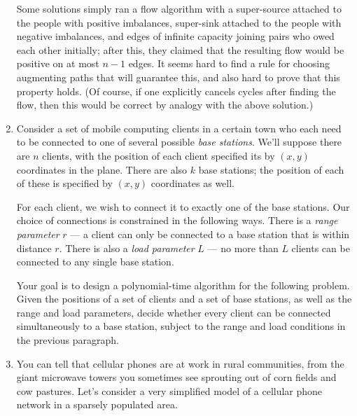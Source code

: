 \documentclass[12pt]{article}
\begin{document}
\begin{enumerate}
{Some solutions simply ran a flow algorithm with
a super-source attached to the people with positive
imbalances, super-sink attached to the people with negative imbalances,
and edges of infinite capacity joining pairs who owed each other initially;
after this, they claimed that the resulting flow would be
positive on at most $n-1$ edges.
It seems hard to find a rule for choosing augmenting paths that
will guarantee this, and also hard to prove that this property holds.
(Of course, if one explicitly cancels cycles after finding
the flow, then this would be correct by analogy with the above solution.)

}

\item


Consider a set of mobile computing clients
in a certain town
who each need to be connected to one of several
possible {\em base stations}.
We'll suppose there are $n$ clients, with
the position of each client specified its by $(x,y)$
coordinates in the plane.
There are also $k$ base stations; the position of
each of these is specified by $(x,y)$ coordinates as well.

For each client, we wish to connect it to exactly one of the base stations.
Our choice of connections is constrained in the following ways.
There is a {\em range parameter} $r$ --- a client
can only be connected to a base station that is within distance $r$.
There is also a {\em load parameter} $L$ --- no more
than $L$ clients can be connected to any single base station.

Your goal is to design a polynomial-time algorithm for the
following problem.
Given the positions of a set of clients and a set of base
stations, as well as the range and load parameters,
decide whether every client can be connected
simultaneously to a base station,
subject to the range and load conditions in the previous paragraph.




\item

You can tell that cellular phones are at work in rural communities,
from the giant microwave towers you sometimes see sprouting out
of corn fields and cow pastures.
Let's consider a very simplified model of a cellular phone network
in a sparsely populated area.


\end{enumerate}
\end{document}
